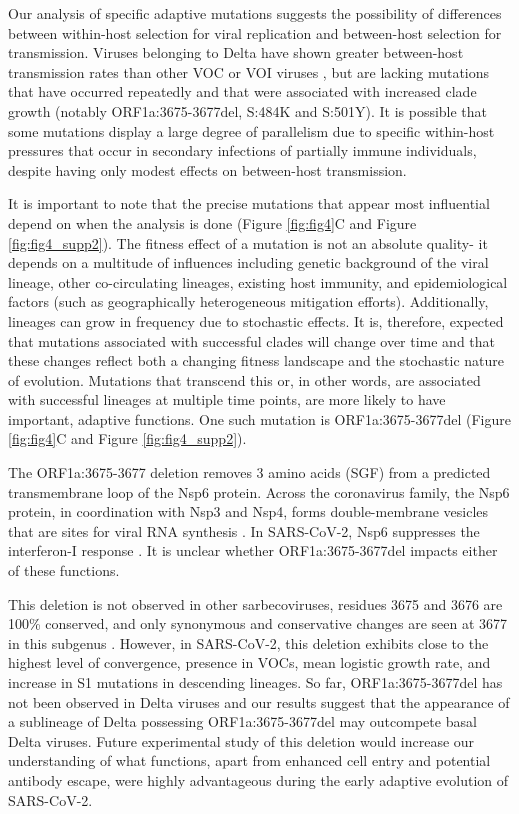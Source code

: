 \documentclass[11pt,oneside,letterpaper]{article}
\begin{document}
Our analysis of specific adaptive mutations suggests the possibility of differences between within-host selection for viral replication and between-host selection for transmission. Viruses belonging to Delta have shown greater between-host transmission rates than other VOC or VOI viruses \cite{Campbell2021-cx}, but are lacking mutations that have occurred repeatedly and that were associated with increased clade growth (notably ORF1a:3675-3677del, S:484K and S:501Y). It is possible that some mutations display a large degree of parallelism due to specific within-host pressures that occur in secondary infections of partially immune individuals, despite having only modest effects on between-host transmission.

It is important to note that the precise mutations that appear most influential depend on when the analysis is done (Figure \ref{fig:fig4}C and Figure \ref{fig:fig4_supp2}). The fitness effect of a mutation is not an absolute quality- it depends on a multitude of influences including genetic background of the viral lineage, other co-circulating lineages, existing host immunity, and epidemiological factors (such as geographically heterogeneous mitigation efforts). Additionally, lineages can grow in frequency due to stochastic effects. It is, therefore, expected that mutations associated with successful clades will change over time and that these changes reflect both a changing fitness landscape and the stochastic nature of evolution. Mutations that transcend this or, in other words, are associated with successful lineages at multiple time points, are more likely to have important, adaptive functions. One such mutation is ORF1a:3675-3677del (Figure \ref{fig:fig4}C and Figure \ref{fig:fig4_supp2}).

The ORF1a:3675-3677 deletion removes 3 amino acids (SGF) from a predicted transmembrane loop \cite{Benvenuto2020-uc} of the Nsp6 protein. Across the coronavirus family, the Nsp6 protein, in coordination with Nsp3 and Nsp4, forms double-membrane vesicles that are sites for viral RNA synthesis \cite{Snijder2020-vx}. In SARS-CoV-2, Nsp6 suppresses the interferon-I response \cite{Xia2020-zs}. It is unclear whether ORF1a:3675-3677del impacts either of these functions.

This deletion is not observed in other sarbecoviruses, residues 3675 and 3676 are 100\% conserved, and only synonymous and conservative changes are seen at 3677 in this subgenus \cite{Jungreis2021-vv}. However, in SARS-CoV-2, this deletion exhibits close to the highest level of convergence, presence in VOCs, mean logistic growth rate, and increase in S1 mutations in descending lineages. So far, ORF1a:3675-3677del has not been observed in Delta viruses and our results suggest that the appearance of a sublineage of Delta possessing ORF1a:3675-3677del may outcompete basal Delta viruses. Future experimental study of this deletion would increase our understanding of what functions, apart from enhanced cell entry and potential antibody escape, were highly advantageous during the early adaptive evolution of SARS-CoV-2.
\end{document}
